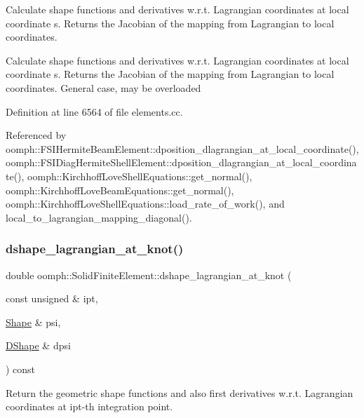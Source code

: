 Calculate shape functions and derivatives w.\+r.\+t. Lagrangian coordinates at local coordinate s. Returns the Jacobian of the mapping from Lagrangian to local coordinates. 

Calculate shape functions and derivatives w.\+r.\+t. Lagrangian coordinates at local coordinate s. Returns the Jacobian of the mapping from Lagrangian to local coordinates. General case, may be overloaded 

Definition at line 6564 of file elements.\+cc.



Referenced by oomph\+::\+F\+S\+I\+Hermite\+Beam\+Element\+::dposition\+\_\+dlagrangian\+\_\+at\+\_\+local\+\_\+coordinate(), oomph\+::\+F\+S\+I\+Diag\+Hermite\+Shell\+Element\+::dposition\+\_\+dlagrangian\+\_\+at\+\_\+local\+\_\+coordinate(), oomph\+::\+Kirchhoff\+Love\+Shell\+Equations\+::get\+\_\+normal(), oomph\+::\+Kirchhoff\+Love\+Beam\+Equations\+::get\+\_\+normal(), oomph\+::\+Kirchhoff\+Love\+Shell\+Equations\+::load\+\_\+rate\+\_\+of\+\_\+work(), and local\+\_\+to\+\_\+lagrangian\+\_\+mapping\+\_\+diagonal().

\mbox{\label{classoomph_1_1SolidFiniteElement_aa48b4880f69bb28d267ff27e7b1967e7}} 
\subsubsection{\texorpdfstring{dshape\+\_\+lagrangian\+\_\+at\+\_\+knot()}{dshape\_lagrangian\_at\_knot()}}
{\footnotesize\ttfamily double oomph\+::\+Solid\+Finite\+Element\+::dshape\+\_\+lagrangian\+\_\+at\+\_\+knot (\begin{DoxyParamCaption}\item[{const unsigned \&}]{ipt,  }\item[{\hyperlink{classoomph_1_1Shape}{Shape} \&}]{psi,  }\item[{\hyperlink{classoomph_1_1DShape}{D\+Shape} \&}]{dpsi }\end{DoxyParamCaption}) const\hspace{0.3cm}{\ttfamily [virtual]}}



Return the geometric shape functions and also first derivatives w.\+r.\+t. Lagrangian coordinates at ipt-\/th integration point. 


